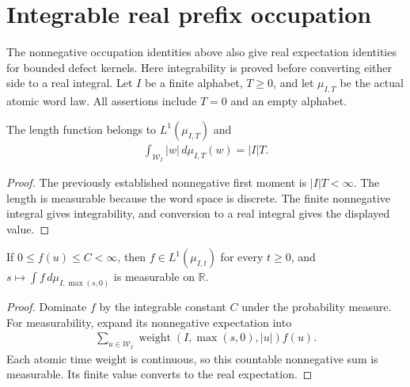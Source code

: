 \section{Integrable real prefix occupation}
\label{sec:poisson_word_real_occupation}

The nonnegative occupation identities above also give real expectation
identities for bounded defect kernels.  Here integrability is proved
before converting either side to a real integral.  Let $I$ be a finite
alphabet, $T\geq0$, and let $\mu_{I,T}$ be the actual atomic word law.
All assertions include $T=0$ and an empty alphabet.

\begin{lemma}
\label{lem:poisson_word_real_length}
\leanok
The length function belongs to $L^1(\mu_{I,T})$ and
\begin{align}
 \int_{\mathcal W_I}|w|\,d\mu_{I,T}(w)=|I|T.
 \label{eq:poisson_word_real_length}
\end{align}
\end{lemma}
\begin{proof}
\leanok
{}
The previously established nonnegative first moment is $|I|T<\infty$.
The length is measurable because the word space is discrete.  The
finite nonnegative integral gives integrability, and conversion to a
real integral gives the displayed value.
\end{proof}

\begin{lemma}
\label{lem:poisson_word_bounded_real_kernel}
\leanok
{}
If $0\leq f(u)\leq C<\infty$, then $f\in L^1(\mu_{I,t})$ for every
$t\geq0$, and
$s\mapsto\int f\,d\mu_{I,\max(s,0)}$ is measurable on $\mathbb R$.
\end{lemma}
\begin{proof}
\leanok
{}
Dominate $f$ by the integrable constant $C$ under the probability
measure.  For measurability, expand its nonnegative expectation into
\begin{align*}
 \sum_{u\in\mathcal W_I}
 \operatorname{weight}(I,\max(s,0),|u|)f(u).
\end{align*}
Each atomic time weight is continuous, so this countable nonnegative
sum is measurable.  Its finite value converts to the real expectation.
\end{proof}

